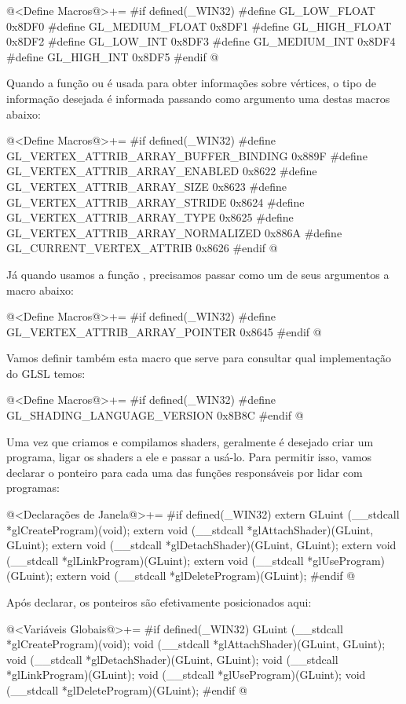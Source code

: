 \iniciocodigo
@<Define Macros@>+=
#if defined(_WIN32)
#define GL_LOW_FLOAT    0x8DF0
#define GL_MEDIUM_FLOAT 0x8DF1
#define GL_HIGH_FLOAT   0x8DF2
#define GL_LOW_INT      0x8DF3
#define GL_MEDIUM_INT   0x8DF4
#define GL_HIGH_INT     0x8DF5
#endif
@
\fimcodigo

Quando a função 
ou  é usada para obter informações
sobre vértices, o tipo de informação desejada é informada passando
como argumento uma destas macros abaixo:

\iniciocodigo
@<Define Macros@>+=
#if defined(_WIN32)
#define GL_VERTEX_ATTRIB_ARRAY_BUFFER_BINDING 0x889F
#define GL_VERTEX_ATTRIB_ARRAY_ENABLED        0x8622
#define GL_VERTEX_ATTRIB_ARRAY_SIZE           0x8623
#define GL_VERTEX_ATTRIB_ARRAY_STRIDE         0x8624
#define GL_VERTEX_ATTRIB_ARRAY_TYPE           0x8625
#define GL_VERTEX_ATTRIB_ARRAY_NORMALIZED     0x886A
#define GL_CURRENT_VERTEX_ATTRIB              0x8626
#endif
@
\fimcodigo

Já quando usamos a função ,
precisamos passar como um de seus argumentos a macro abaixo:

\iniciocodigo
@<Define Macros@>+=
#if defined(_WIN32)
#define GL_VERTEX_ATTRIB_ARRAY_POINTER 0x8645
#endif
@
\fimcodigo

Vamos definir também esta macro que serve para consultar qual
implementação do GLSL temos:

\iniciocodigo
@<Define Macros@>+=
#if defined(_WIN32)
#define GL_SHADING_LANGUAGE_VERSION 0x8B8C
#endif
@
\fimcodigo

Uma vez que criamos e compilamos shaders, geralmente é desejado criar
um programa, ligar os shaders a ele e passar a usá-lo. Para permitir
isso, vamos declarar o ponteiro para cada uma das funções responsáveis
por lidar com programas:

\iniciocodigo
@<Declarações de Janela@>+=
#if defined(_WIN32)
extern GLuint (__stdcall *glCreateProgram)(void);
extern void (__stdcall *glAttachShader)(GLuint, GLuint);
extern void (__stdcall *glDetachShader)(GLuint, GLuint);
extern void (__stdcall *glLinkProgram)(GLuint);
extern void (__stdcall *glUseProgram)(GLuint);
extern void (__stdcall *glDeleteProgram)(GLuint);
#endif
@
\fimcodigo

Após declarar, os ponteiros são efetivamente posicionados aqui:

\iniciocodigo
@<Variáveis Globais@>+=
#if defined(_WIN32)
GLuint (__stdcall *glCreateProgram)(void);
void (__stdcall *glAttachShader)(GLuint, GLuint);
void (__stdcall *glDetachShader)(GLuint, GLuint);
void (__stdcall *glLinkProgram)(GLuint);
void (__stdcall *glUseProgram)(GLuint);
void (__stdcall *glDeleteProgram)(GLuint);
#endif
@
\fimcodigo

